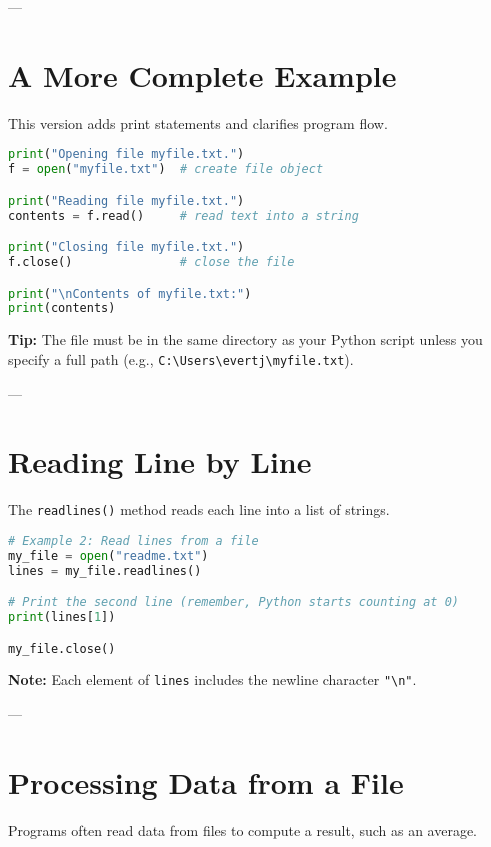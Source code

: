 ---

\section{A More Complete Example}

This version adds print statements and clarifies program flow.

\begin{lstlisting}[language=Python, caption={Creating a file object and reading text.}]
print("Opening file myfile.txt.")
f = open("myfile.txt")  # create file object

print("Reading file myfile.txt.")
contents = f.read()     # read text into a string

print("Closing file myfile.txt.")
f.close()               # close the file

print("\nContents of myfile.txt:")
print(contents)
\end{lstlisting}

\textbf{Tip:} The file must be in the same directory as your Python script unless you specify a full path (e.g., \texttt{C:\textbackslash Users\textbackslash evertj\textbackslash myfile.txt}).

---

\section{Reading Line by Line}

The \texttt{readlines()} method reads each line into a list of strings.

\begin{lstlisting}[language=Python, caption={Reading all lines into a list.}]
# Example 2: Read lines from a file
my_file = open("readme.txt")
lines = my_file.readlines()

# Print the second line (remember, Python starts counting at 0)
print(lines[1])

my_file.close()
\end{lstlisting}

\textbf{Note:} Each element of \texttt{lines} includes the newline character \texttt{"\textbackslash n"}.

---

\section{Processing Data from a File}

Programs often read data from files to compute a result, such as an average.

